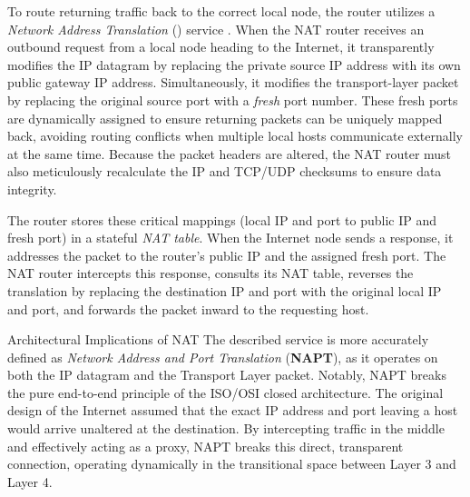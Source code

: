 To route returning traffic back to the correct local node, the router utilizes a \emph{Network Address Translation} () service \cite{rfc3022}. When the NAT router receives an outbound request from a local node heading to the Internet, it transparently modifies the IP datagram by replacing the private source IP address with its own public gateway IP address. Simultaneously, it modifies the transport-layer packet by replacing the original source port with a \emph{fresh} port number. These fresh ports are dynamically assigned to ensure returning packets can be uniquely mapped back, avoiding routing conflicts when multiple local hosts communicate externally at the same time. Because the packet headers are altered, the NAT router must also meticulously recalculate the IP and TCP/UDP checksums to ensure data integrity. 

The router stores these critical mappings (local IP and port to public IP and fresh port) in a stateful \emph{NAT table}. When the Internet node sends a response, it addresses the packet to the router's public IP and the assigned fresh port. The NAT router intercepts this response, consults its NAT table, reverses the translation by replacing the destination IP and port with the original local IP and port, and forwards the packet inward to the requesting host.

\begin{note}{Architectural Implications of NAT}
The described service is more accurately defined as \emph{Network Address and Port Translation} (\textbf{NAPT}), as it operates on both the IP datagram and the Transport Layer packet. Notably, NAPT breaks the pure end-to-end principle of the ISO/OSI closed architecture. The original design of the Internet assumed that the exact IP address and port leaving a host would arrive unaltered at the destination. By intercepting traffic in the middle and effectively acting as a proxy, NAPT breaks this direct, transparent connection, operating dynamically in the transitional space between Layer 3 and Layer 4.
\end{note}
 
